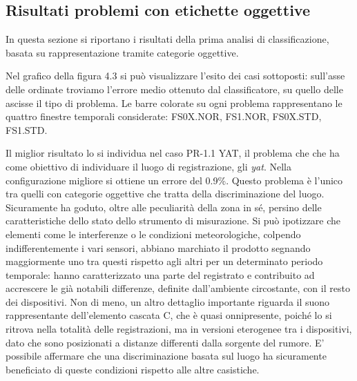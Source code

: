 \clearpage
\subsection{Risultati problemi con etichette oggettive}
In questa sezione si riportano i risultati della prima analisi di classificazione, basata su
rappresentazione tramite categorie oggettive.

Nel grafico della figura 4.3 si può visualizzare l’esito dei casi sottoposti: sull’asse delle ordinate troviamo
l’errore medio ottenuto dal classificatore, su quello delle ascisse il tipo di problema. Le barre
colorate su ogni problema rappresentano le quattro finestre temporali considerate:
FS0X.NOR, FS1.NOR, FS0X.STD, FS1.STD.

Il miglior risultato lo si individua nel caso PR-1.1 YAT, il problema che che ha come
obiettivo di individuare il luogo di registrazione, gli \textit{yat}. Nella configurazione migliore si
ottiene un errore del 0.9\%. Questo problema è l’unico tra quelli con categorie oggettive che
tratta della discriminazione del luogo. Sicuramente ha goduto, oltre alle peculiarità della zona
in sé, persino delle caratteristiche dello stato dello strumento di misurazione. Si può
ipotizzare che elementi come le interferenze o le condizioni meteorologiche, colpendo
indifferentemente i vari sensori, abbiano marchiato il prodotto segnando maggiormente uno
tra questi rispetto agli altri per un determinato periodo temporale: hanno caratterizzato una
parte del registrato e contribuito ad accrescere le già notabili differenze, definite
dall’ambiente circostante, con il resto dei dispositivi. Non di meno, un altro dettaglio
importante riguarda il suono rappresentante dell’elemento cascata C, che è quasi
onnipresente, poiché lo si ritrova nella totalità delle registrazioni, ma in versioni eterogenee
tra i dispositivi, dato che sono posizionati a distanze differenti dalla sorgente del rumore. E’
possibile affermare che una discriminazione basata sul luogo ha sicuramente beneficiato di
queste condizioni rispetto alle altre casistiche.

